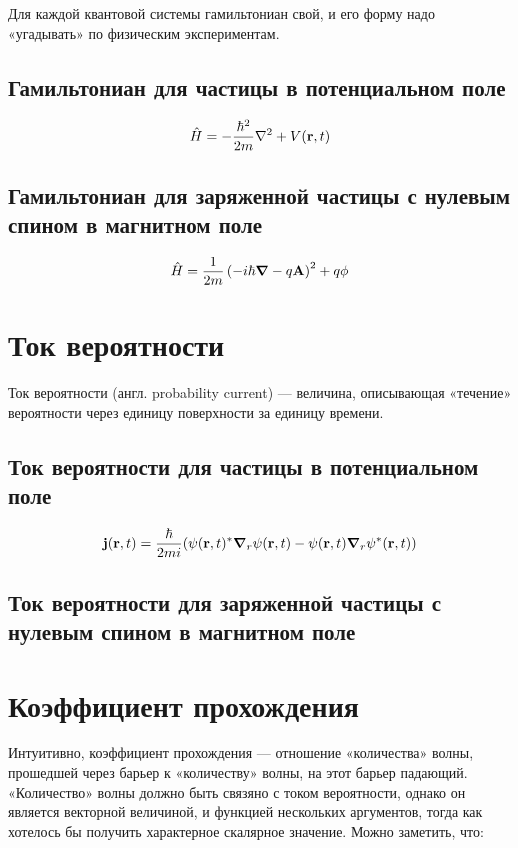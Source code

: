 Для каждой квантовой системы гамильтониан свой, и его форму надо «угадывать» по физическим экспериментам.

\subsection{Гамильтониан для частицы в потенциальном поле}
\[
\hat{H} = - \frac{\hbar^2}{2 m} \laplacian + V(\vb{r}, t)
\]

\subsection{Гамильтониан для заряженной частицы с нулевым спином в магнитном поле}
\[
\hat{H} = \frac{1}{2m} \left( -i \hbar \grad - q \vb{A} \right)^2 + q \phi
\]

\section{Ток вероятности}
Ток вероятности (англ. probability current) — величина, описывающая «течение» вероятности через единицу поверхности за единицу времени. 


\subsection{Ток вероятности для частицы в потенциальном поле}
\[
\vb{j}(\vb{r}, t) = \frac{\hbar}{2 m i} (\psi(\vb{r}, t)^* \grad_r{\psi(\vb{r}, t)} - \psi(\vb{r}, t) \grad_r{\psi^*(\vb{r}, t))}
\]

\subsection{Ток вероятности для заряженной частицы с нулевым спином в магнитном поле}


\section{Коэффициент прохождения}
Интуитивно, коэффициент прохождения — отношение «количества» волны, прошедшей через барьер к «количеству» волны, на этот барьер падающий. «Количество» волны должно быть связяно с током вероятности, однако он является векторной величиной, и функцией нескольких аргументов, тогда как хотелось бы получить характерное скалярное значение. Можно заметить, что:

